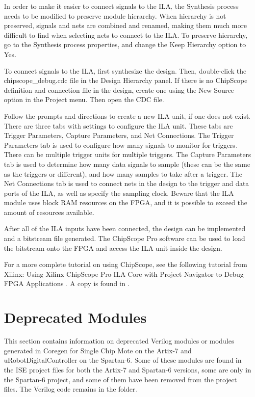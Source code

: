 In order to make it easier to connect signals to the ILA, the Synthesis process needs to be modified to preserve module hierarchy. When hierarchy is not preserved, signals and nets are combined and renamed, making them much more difficult to find when selecting nets to connect to the ILA. To preserve hierarchy, go to the Synthesis process properties, and change the Keep Hierarchy option to Yes.

To connect signals to the ILA, first synthesize the design. Then, double-click the chipscope\_debug.cdc file in the Design Hierarchy panel. If there is no ChipScope definition and connection file in the design, create one using the New Source option in the Project menu. Then open the CDC file.

Follow the prompts and directions to create a new ILA unit, if one does not exist. There are three tabs with settings to configure the ILA unit. These tabs are Trigger Parameters, Capture Parameters, and Net Connections. The Trigger Parameters tab is used to configure how many signals to monitor for triggers. There can be multiple trigger units for multiple triggers. The Capture Parameters tab is used to determine how many data signals to sample (these can be the same as the triggers or different), and how many samples to take after a trigger. The Net Connections tab is used to connect nets in the design to the trigger and data ports of the ILA, as well as specify the sampling clock. Beware that the ILA module uses block RAM resources on the FPGA, and it is possible to exceed the amount of resources available.

After all of the ILA inputs have been connected, the design can be implemented and a bitstream file generated. The ChipScope Pro software can be used to load the bitstream onto the FPGA and access the ILA unit inside the design.

For a more complete tutorial on using ChipScope, see the following tutorial from Xilinx: Using Xilinx ChipScope Pro ILA Core with Project Navigator to Debug FPGA Applications \cite{chipscope-pro-tutorial}. A copy is found in .

\section{Deprecated Modules}
This section contains information on deprecated Verilog modules or modules generated in Coregen for Single Chip Mote on the Artix-7 and uRobotDigitalController on the Spartan-6. Some of these modules are found in the ISE project files for both the Artix-7 and Spartan-6 versions, some are only in the Spartan-6 project, and some of them have been removed from the project files. The Verilog code remains in the  folder.

